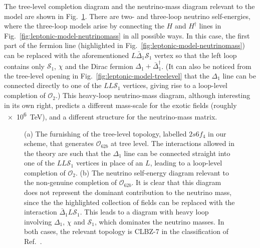 The tree-level completion diagram and the neutrino-mass diagram relevant to the
model are shown in Fig.~\ref{fig:leptonic-model-diagrams}. There are two- and
three-loop neutrino self-energies, where the three-loop models arise by
connecting the $H$ and $H^{\dagger}$ lines in
Fig.~\ref{fig:leptonic-model-neutrinomass} in all possible ways. In this case,
the first part of the fermion line (highlighted in
Fig.~\ref{fig:leptonic-model-neutrinomass}) can be replaced with the
aforementioned $L\bar{\Delta}_{1}\mathcal{S}_{1}$ vertex so that the left loop
contains only $\mathcal{S}_{1}$, $\chi$ and the Dirac fermion
$\Delta_{1} + \bar{\Delta}_{1}^{\dagger}$. (It can also be noticed from the
tree-level opening in Fig.~\ref{fig:leptonic-model-treelevel} that the
$\Delta_{1}$ line can be connected directly to one of the $LL\mathcal{S}_{1}$
vertices, giving rise to a loop-level completion of $\mathcal{O}_{2}$.) This
heavy-loop neutrino-mass diagram, although interesting in its own right,
predicts a different mass-scale for the exotic fields (roughly \SI{e6}{\TeV}),
and a different structure for the neutrino-mass matrix.

\begin{figure}[t]
  \centering
  \caption[(a) The furnishing of the tree-level topology, labelled $2s6f_4$ in
  our scheme, that generates $\mathcal{O}_{62b}$ at tree level. (b) The neutrino
  self-energy diagram relevant to the non-genuine completion of
  $\mathcal{O}_{62b}$.]{(a) The furnishing of the tree-level topology, labelled
    $2s6f_4$ in our scheme, that generates $\mathcal{O}_{62b}$ at tree level.
    The interactions allowed in the theory are such that the $\Delta_{1}$ line
    can be connected straight into one of the $LL\mathcal{S}_{1}$ vertices in
    place of an $L$, leading to a loop-level completion of $\mathcal{O}_{2}$.
    (b) The neutrino self-energy diagram relevant to the non-genuine completion
    of $\mathcal{O}_{62b}$. It is clear that this diagram does not represent the
    dominant contribution to the neutrino mass, since the the highlighted
    collection of fields can be replaced with the interaction
    $\bar{\Delta}_{1} L \mathcal{S}_{1}$. This leads to a diagram with heavy
    loop involving $\Delta_{1}$, $\chi$ and $\mathcal{S}_{1}$, which dominates
    the neutrino masses. In both cases, the relevant topology is CLBZ-7 in the
    classification of Ref.~\cite{Sierra:2014rxa}.}
  \label{fig:leptonic-model-diagrams}
\end{figure}


